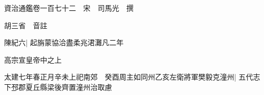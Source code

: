 






























































資治通鑑卷一百七十二　宋　司馬光　撰

胡三省　音註

陳紀六|{
	起旃蒙協洽盡柔兆涒灘凡二年}


高宗宣皇帝中之上

太建七年春正月辛未上祀南郊　癸酉周主如同州乙亥左衛將軍樊毅克潼州|{
	五代志下邳郡夏丘縣梁後齊置潼州治取慮}


